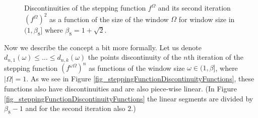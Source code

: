 \documentclass[text.tex]{subfiles}
\begin{document}
\begin{figure}[h!]
\caption{Discontinuities of the stepping function $f^\Omega$ and its second iteration $(f^\Omega)^2$ as a function of the size of the window $\Omega$ for window size in $(1,\beta_8]$ where $\beta_8 = 1+\sqrt{2}$. }
\label{fig_steppingFunctionDiscontinuities}
\end{figure}

Now we describe the concept a bit more formally. Let us denote $d_{n,1}(\omega)\leq\dots\leq d_{n,k}(\omega)$ the points discontinuity of the $n$th iteration of the stepping function $(f^{\omega\Omega})^n$ as functions of the window size $\omega\in(1,\beta]$, where $|\Omega|=1$. As we see in Figure \ref{fig_steppingFunctionDiscontinuityFunctions}, these functions also have discontinuities and are also piece-wise linear. (In Figure \ref{fig_steppingFunctionDiscontinuityFunctions} the linear segments are divided by $\beta_8-1$ and for the second iteration also $2$.) 
\end{document}
